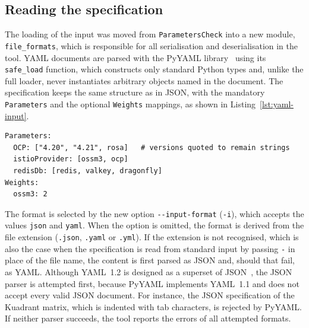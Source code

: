 \documentclass[
  digital, %
  oneside, %
  lof,     %
  nolot,     %
]{fithesis4}
\begin{document}
\subsection{Reading the specification}
The loading of the input was moved from \texttt{ParametersCheck} into a new
module, \texttt{file\_formats}, which is responsible for all serialisation and
deserialisation in the tool. \gls{YAML} documents are parsed with the PyYAML
library~\cite{pyyaml} using its \texttt{safe\_load} function, which constructs
only standard Python types and, unlike the full loader, never instantiates
arbitrary objects named in the document. The specification keeps the same
structure as in \gls{JSON}, with the mandatory \texttt{Parameters} and the
optional \texttt{Weights} mappings, as shown in Listing~\ref{lst:yaml-input}.
%
\begin{lstlisting}[caption={Specification of parameters in YAML.},label={lst:yaml-input}]
Parameters:
  OCP: ["4.20", "4.21", rosa]   # versions quoted to remain strings
  istioProvider: [ossm3, ocp]
  redisDb: [redis, valkey, dragonfly]
Weights:
  ossm3: 2
\end{lstlisting}
%
The format is selected by the new option \texttt{-{}-input-format}
(\texttt{-i}), which accepts the values \texttt{json} and \texttt{yaml}. When
the option is omitted, the format is derived from the file extension
(\texttt{.json}, \texttt{.yaml} or \texttt{.yml}). If the extension is not
recognised, which is also the case when the specification is read from standard
input by passing \texttt{-} in place of the file name, the content is first
parsed as \gls{JSON} and, should that fail, as \gls{YAML}. Although \gls{YAML}~1.2
is designed as a superset of \gls{JSON}~\cite{yaml-spec}, the \gls{JSON} parser
is attempted first, because PyYAML implements \gls{YAML}~1.1 and does not accept
every valid \gls{JSON} document. For instance, the \gls{JSON} specification of
the Kuadrant matrix, which is indented with tab characters, is rejected by
PyYAML. If neither parser succeeds, the tool reports the errors of all attempted
formats.
\end{document}
